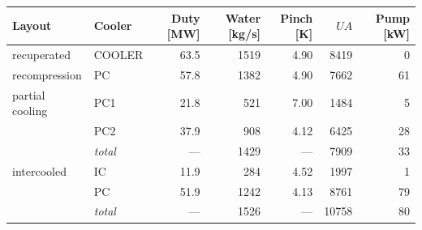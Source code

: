 \begin{tabular}{@{}llrrrrr@{}}
\toprule
Layout & Cooler & Duty [MW] & Water [kg/s] & Pinch [K] & $UA$ & Pump [kW] \\
\midrule
recuperated & COOLER & 63.5 & 1519 & 4.90 & 8419 & 0 \\
recompression & PC & 57.8 & 1382 & 4.90 & 7662 & 61 \\
partial cooling & PC1 & 21.8 & 521 & 7.00 & 1484 & 5 \\
 & PC2 & 37.9 & 908 & 4.12 & 6425 & 28 \\
 & \emph{total} & --- & 1429 & --- & 7909 & 33 \\
intercooled & IC & 11.9 & 284 & 4.52 & 1997 & 1 \\
 & PC & 51.9 & 1242 & 4.13 & 8761 & 79 \\
 & \emph{total} & --- & 1526 & --- & 10758 & 80 \\
\bottomrule
\end{tabular}
